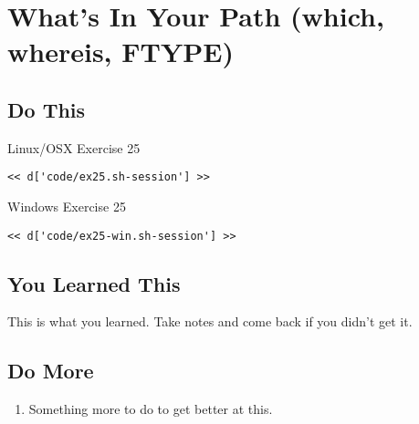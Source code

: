 \chapter{What's In Your Path (which, whereis, FTYPE)}

\section{Do This}

\begin{code}{Linux/OSX Exercise 25}
\begin{Verbatim}
<< d['code/ex25.sh-session'] >>
\end{Verbatim}
\end{code}

\begin{code}{Windows Exercise 25}
\begin{Verbatim}
<< d['code/ex25-win.sh-session'] >>
\end{Verbatim}
\end{code}

\section{You Learned This}

This is what you learned.  Take notes and come back if you didn't get it.

\section{Do More}

\begin{enumerate}
\item Something more to do to get better at this.
\end{enumerate}

